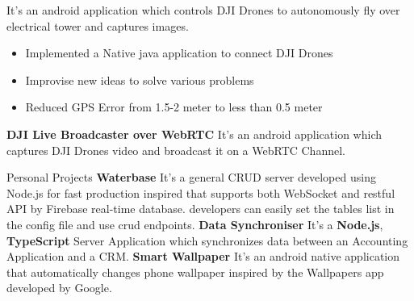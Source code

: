 \begin{cventries}
{        {It's an android application which controls DJI Drones to autonomously fly over electrical tower and captures images.}    
        \begin{itemize}
            \item Implemented a Native java application to connect DJI Drones
            \item Improvise new ideas to solve various problems
            \item Reduced GPS Error from 1.5-2 meter to less than 0.5 meter
        \end{itemize}
        \textcolor{primary}{\textbf{DJI Live Broadcaster over WebRTC}}\break
        {It's an android application which captures DJI Drones video and broadcast it on a WebRTC Channel.}\break
        \break
    }   
  \cventry
    {} %
    {Personal Projects} %
    {} %
    {} %
    {
        \textcolor{primary}{\textbf{Waterbase}}\break
        {It's a general CRUD server developed using Node.js for fast production inspired that supports both WebSocket and restful API by Firebase real-time database. developers can easily set the tables list in the config file and use crud endpoints.}\break
        \break
        \textcolor{primary}{\textbf{Data Synchroniser}}\break
        {It's a \textbf{Node.js}, \textbf{TypeScript} Server Application which synchronizes data between an Accounting Application and a CRM.}\break
        \break
        \textcolor{primary}{\textbf{Smart Wallpaper}}\break
        {It's an android native application that automatically changes phone wallpaper inspired by the Wallpapers app developed by Google.}\break
    }
\end{cventries}

